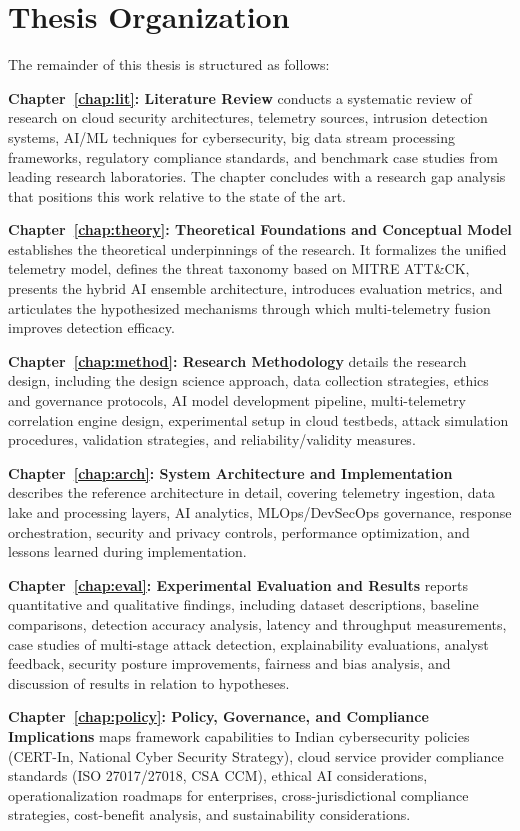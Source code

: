 \section{Thesis Organization}\label{sec:intro-organization}
The remainder of this thesis is structured as follows:

\textbf{Chapter~\ref{chap:lit}: Literature Review} conducts a systematic review of research on cloud security architectures, telemetry sources, intrusion detection systems, AI/ML techniques for cybersecurity, big data stream processing frameworks, regulatory compliance standards, and benchmark case studies from leading research laboratories. The chapter concludes with a research gap analysis that positions this work relative to the state of the art.

\textbf{Chapter~\ref{chap:theory}: Theoretical Foundations and Conceptual Model} establishes the theoretical underpinnings of the research. It formalizes the unified telemetry model, defines the threat taxonomy based on MITRE ATT\&CK, presents the hybrid AI ensemble architecture, introduces evaluation metrics, and articulates the hypothesized mechanisms through which multi-telemetry fusion improves detection efficacy.

\textbf{Chapter~\ref{chap:method}: Research Methodology} details the research design, including the design science approach, data collection strategies, ethics and governance protocols, AI model development pipeline, multi-telemetry correlation engine design, experimental setup in cloud testbeds, attack simulation procedures, validation strategies, and reliability/validity measures.

\textbf{Chapter~\ref{chap:arch}: System Architecture and Implementation} describes the reference architecture in detail, covering telemetry ingestion, data lake and processing layers, AI analytics, MLOps/DevSecOps governance, response orchestration, security and privacy controls, performance optimization, and lessons learned during implementation.

\textbf{Chapter~\ref{chap:eval}: Experimental Evaluation and Results} reports quantitative and qualitative findings, including dataset descriptions, baseline comparisons, detection accuracy analysis, latency and throughput measurements, case studies of multi-stage attack detection, explainability evaluations, analyst feedback, security posture improvements, fairness and bias analysis, and discussion of results in relation to hypotheses.

\textbf{Chapter~\ref{chap:policy}: Policy, Governance, and Compliance Implications} maps framework capabilities to Indian cybersecurity policies (CERT-In, National Cyber Security Strategy), cloud service provider compliance standards (ISO 27017/27018, CSA CCM), ethical AI considerations, operationalization roadmaps for enterprises, cross-jurisdictional compliance strategies, cost-benefit analysis, and sustainability considerations.

